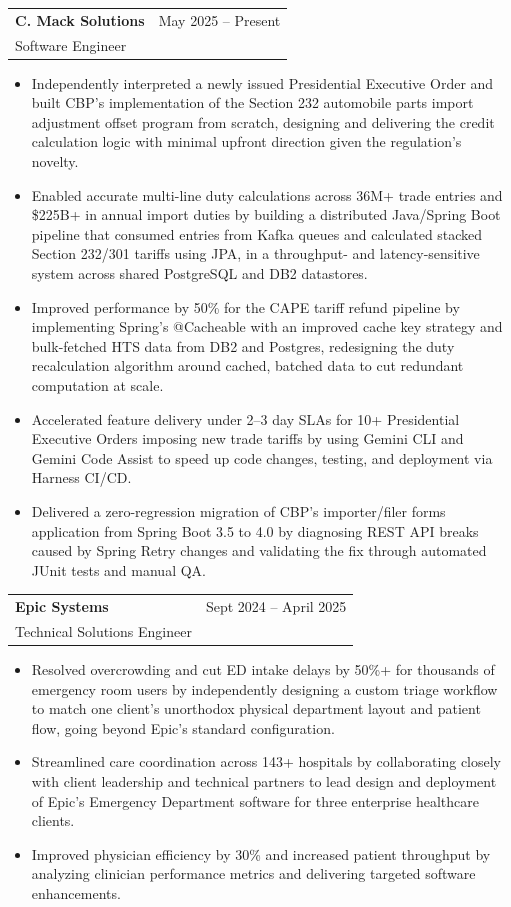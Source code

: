 \documentclass[letterpaper,11pt]{article}
\makeatletter
\newcommand{\resumeItem}[1]{
  \item\small{
    {#1 \vspace{-2pt}}
  }
}
\newcommand{\resumeSubheading}[4]{
  \vspace{-1pt}\item
    \begin{tabular*}{0.97\textwidth}[t]{l@{\extracolsep{\fill}}r}
      \textbf{#1} & #2 \\
      #3 & \textit{\small #4} \\
    \end{tabular*}\vspace{-5pt}
}
\newcommand{\resumeItemListStart}{\begin{itemize}[itemsep=-1pt]}
\newcommand{\resumeItemListEnd}{\end{itemize}\vspace{-4pt}}
\makeatother
\begin{document}
    \resumeSubheading
      {C. Mack Solutions}{May 2025 -- Present}
      {Software Engineer}{}
      \resumeItemListStart
        \resumeItem{Independently interpreted a newly issued Presidential Executive Order and built CBP's implementation of the Section 232 automobile parts import adjustment offset program from scratch, designing and delivering the credit calculation logic with minimal upfront direction given the regulation's novelty.}
        \resumeItem{Enabled accurate multi-line duty calculations across 36M+ trade entries and \$225B+ in annual import duties by building a distributed Java/Spring Boot pipeline that consumed entries from Kafka queues and calculated stacked Section 232/301 tariffs using JPA, in a throughput- and latency-sensitive system across shared PostgreSQL and DB2 datastores.}
        \resumeItem{Improved performance by 50\% for the CAPE tariff refund pipeline by implementing Spring's @Cacheable with an improved cache key strategy and bulk-fetched HTS data from DB2 and Postgres, redesigning the duty recalculation algorithm around cached, batched data to cut redundant computation at scale.}
        \resumeItem{Accelerated feature delivery under 2--3 day SLAs for 10+ Presidential Executive Orders imposing new trade tariffs by using Gemini CLI and Gemini Code Assist to speed up code changes, testing, and deployment via Harness CI/CD.}
        \resumeItem{Delivered a zero-regression migration of CBP's importer/filer forms application from Spring Boot 3.5 to 4.0 by diagnosing REST API breaks caused by Spring Retry changes and validating the fix through automated JUnit tests and manual QA.}
      \resumeItemListEnd

    \resumeSubheading
      {Epic Systems}{Sept 2024 -- April 2025}
      {Technical Solutions Engineer}{}
      \resumeItemListStart
        \resumeItem{Resolved overcrowding and cut ED intake delays by 50\%+ for thousands of emergency room users by independently designing a custom triage workflow to match one client's unorthodox physical department layout and patient flow, going beyond Epic's standard configuration.}
        \resumeItem{Streamlined care coordination across 143+ hospitals by collaborating closely with client leadership and technical partners to lead design and deployment of Epic's Emergency Department software for three enterprise healthcare clients.}
        \resumeItem{Improved physician efficiency by 30\% and increased patient throughput by analyzing clinician performance metrics and delivering targeted software enhancements.}
      \resumeItemListEnd
\end{document}
